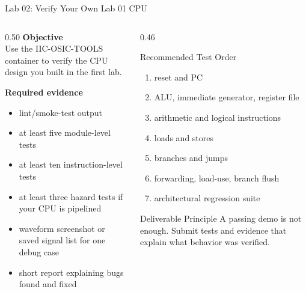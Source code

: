 \documentclass[aspectratio=169,10pt]{beamer}
\begin{document}
\begin{frame}{Lab 02: Verify Your Own Lab 01 CPU}
  \begin{columns}[T]
    \begin{column}{0.50\textwidth}
      \textbf{Objective}\\
      Use the IIC-OSIC-TOOLS container to verify the CPU design you built in the first lab.

      \vspace{0.7em}
      \textbf{Required evidence}
      \begin{itemize}
        \item lint/smoke-test output
        \item at least five module-level tests
        \item at least ten instruction-level tests
        \item at least three hazard tests if your CPU is pipelined
        \item waveform screenshot or saved signal list for one debug case
        \item short report explaining bugs found and fixed
      \end{itemize}
    \end{column}
    \begin{column}{0.46\textwidth}
      \begin{block}{Recommended Test Order}
        \begin{enumerate}\small
          \item reset and PC
          \item ALU, immediate generator, register file
          \item arithmetic and logical instructions
          \item loads and stores
          \item branches and jumps
          \item forwarding, load-use, branch flush
          \item architectural regression suite
        \end{enumerate}
      \end{block}

      \vspace{0.6em}
      \begin{alertblock}{Deliverable Principle}
        A passing demo is not enough. Submit tests and evidence that explain what behavior was verified.
      \end{alertblock}
    \end{column}
  \end{columns}
\end{frame}
\end{document}
